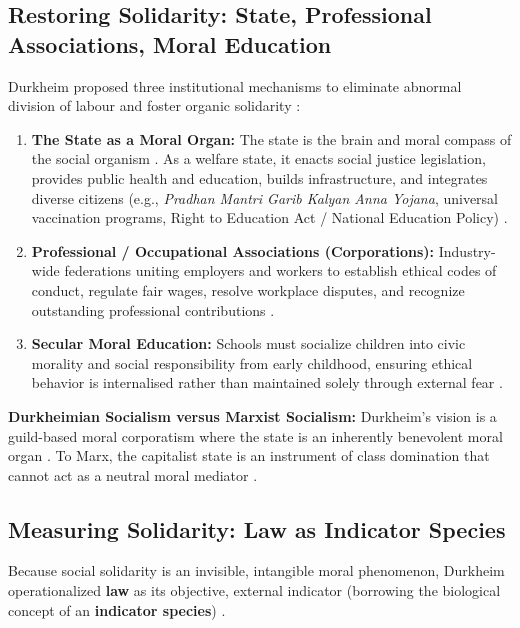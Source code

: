 \subsection{Restoring Solidarity: State, Professional Associations, Moral Education}
Durkheim proposed three institutional mechanisms to eliminate abnormal division of labour and foster organic solidarity :
\begin{enumerate}
    \item \textbf{The State as a Moral Organ:} The state is the brain and moral compass of the social organism . As a welfare state, it enacts social justice legislation, provides public health and education, builds infrastructure, and integrates diverse citizens (e.g., \textit{Pradhan Mantri Garib Kalyan Anna Yojana}, universal vaccination programs, Right to Education Act / National Education Policy) .
    \item \textbf{Professional / Occupational Associations (Corporations):} Industry-wide federations uniting employers and workers to establish ethical codes of conduct, regulate fair wages, resolve workplace disputes, and recognize outstanding professional contributions .
    \item \textbf{Secular Moral Education:} Schools must socialize children into civic morality and social responsibility from early childhood, ensuring ethical behavior is internalised rather than maintained solely through external fear .
\end{enumerate}

\begin{CriticalPoint}
\textbf{Durkheimian Socialism versus Marxist Socialism:} Durkheim's vision is a guild-based moral corporatism where the state is an inherently benevolent moral organ . To Marx, the capitalist state is an instrument of class domination that cannot act as a neutral moral mediator .
\end{CriticalPoint}

\subsection{Measuring Solidarity: Law as Indicator Species}
Because social solidarity is an invisible, intangible moral phenomenon, Durkheim operationalized \textbf{law} as its objective, external indicator (borrowing the biological concept of an \textbf{indicator species}) .

